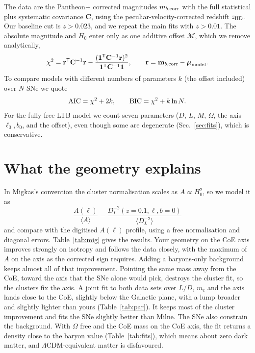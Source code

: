 \documentclass[10pt,twocolumn,letterpaper]{article}
\begin{document}
The data are the Pantheon+ corrected magnitudes $m_{b,\rm corr}$ with the full statistical plus systematic covariance $\mathbf C$, using the peculiar-velocity-corrected redshift $z_{\rm HD}$. Our baseline cut is $z>0.023$, and we repeat the main fits with $z>0.01$. The absolute magnitude and $H_0$ enter only as one additive offset $\mathcal M$, which we remove analytically,
\begin{equation}\label{eq:chi2}
\chi^2=\mathbf r^{\sf T}\mathbf C^{-1}\mathbf r-\frac{(\mathbf 1^{\sf T}\mathbf C^{-1}\mathbf r)^2}{\mathbf 1^{\sf T}\mathbf C^{-1}\mathbf 1},\qquad \mathbf r=\mathbf m_{b,\rm corr}-\boldsymbol\mu_{\rm model}.
\end{equation}
To compare models with different numbers of parameters $k$ (the offset included) over $N$ SNe we quote
\begin{equation}\label{eq:ic}
{\rm AIC}=\chi^2+2k,\qquad {\rm BIC}=\chi^2+k\ln N .
\end{equation}
For the fully free LTB model we count seven parameters ($D$, $L$, $M$, $\Omega$, the axis $\ell_0,b_0$, and the offset), even though some are degenerate (Sec.~\ref{sec:fits}), which is conservative.


\section{What the geometry explains}\label{sec:mig}
In Migkas's convention the cluster normalisation scales as $A\propto H_0^2$, so we model it as
\begin{equation}\label{eq:A}
\frac{A(\ell)}{\langle A\rangle}=\frac{D_L^{-2}(z=0.1,\ell,b=0)}{\big\langle D_L^{-2}\big\rangle}
\end{equation}
and compare with the digitised $A(\ell)$ profile, using a free normalisation and diagonal errors. Table~\ref{tab:mig} gives the results. Your geometry on the CoE axis improves strongly on isotropy and follows the data closely, with the maximum of $A$ on the axis as the corrected sign requires. Adding a baryons-only background keeps almost all of that improvement. Pointing the same mass away from the CoE, toward the axis that the SNe alone would pick, destroys the cluster fit, so the clusters fix the axis. A joint fit to both data sets over $L/D$, $m_c$ and the axis lands close to the CoE, slightly below the Galactic plane, with a lump broader and slightly lighter than yours (Table~\ref{tab:par}). It keeps most of the cluster improvement and fits the SNe slightly better than Milne. The SNe also constrain the background. With $\Omega$ free and the CoE mass on the CoE axis, the fit returns a density close to the baryon value (Table~\ref{tab:fits}), which means about zero dark matter, and $\Lambda$CDM-equivalent matter is disfavoured.
\end{document}

